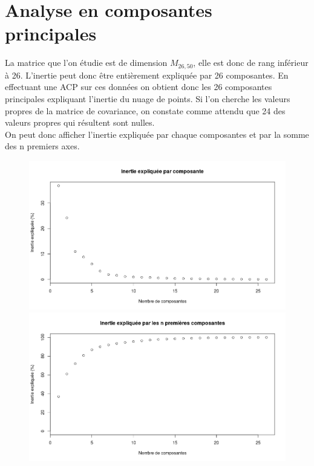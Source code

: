 \documentclass[a4paper, titlepage]{report}
\begin{document}
\section{Analyse en composantes principales}
La matrice que l'on étudie est de dimension $M_{26,50}$, elle est donc de rang inférieur à 26. L'inertie peut donc être entièrement expliquée par 26 composantes. En effectuant une ACP sur ces données on obtient donc les 26 composantes principales expliquant l'inertie du nuage de points. Si l'on cherche les valeurs propres de la matrice de covariance, on constate comme attendu que 24 des valeurs propres qui résultent sont nulles.\\

\newpage
On peut donc afficher l'inertie expliquée par chaque composantes et par la somme des n premiers axes.
\begin{figure}[h]
	\begin{center}
		\includegraphics[scale = 0.32]{./doc/plot-inertie-par-composantes.png}
		\includegraphics[scale = 0.32]{./doc/plot-inertie-n-composantes.png}
	\end{center}
\end{figure}
\end{document}
